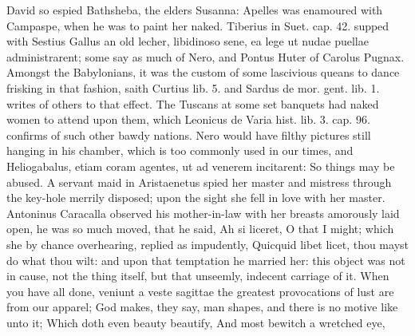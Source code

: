 {David so espied Bathsheba, the elders Susanna: Apelles was
enamoured with Campaspe, when he was to paint her naked. Tiberius in
Suet. cap. 42. supped with Sestius Gallus an old lecher, libidinoso
sene, ea lege ut nudae puellae administrarent; some say as much of
Nero, and Pontus Huter of Carolus Pugnax. Amongst the Babylonians, it
was the custom of some lascivious queans to dance frisking in that
fashion, saith Curtius lib. 5. and Sardus de mor. gent. lib. 1. writes
of others to that effect. The Tuscans at some set banquets had
naked women to attend upon them, which Leonicus de Varia hist. lib. 3.
cap. 96. confirms of such other bawdy nations. Nero would have filthy
pictures still hanging in his chamber, which is too commonly used in
our times, and Heliogabalus, etiam coram agentes, ut ad venerem
incitarent: So things may be abused. A servant maid in Aristaenetus
spied her master and mistress through the key-hole merrily
disposed; upon the sight she fell in love with her master.
Antoninus Caracalla observed his mother-in-law with her breasts
amorously laid open, he was so much moved, that he said, Ah si liceret,
O that I might; which she by chance overhearing, replied as impudently,
Quicquid libet licet, thou mayst do what thou wilt: and upon that
temptation he married her: this object was not in cause, not the thing
itself, but that unseemly, indecent carriage of it.
When you have all done, veniunt a veste sagittae the greatest
provocations of lust are from our apparel; God makes, they say, man
shapes, and there is no motive like unto it;
Which doth even beauty beautify,
And most bewitch a wretched eye,

}
